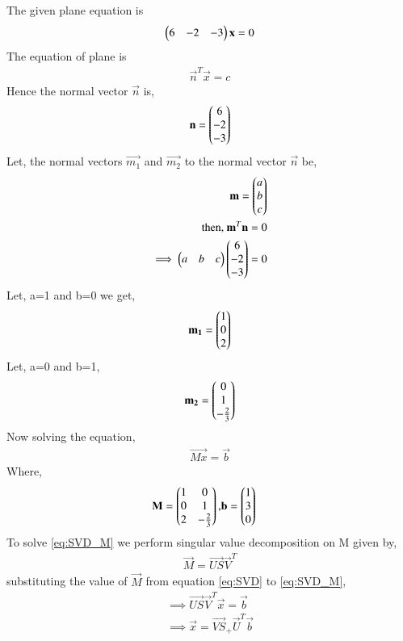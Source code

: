 \documentclass[journal,12pt,twocolumn]{IEEEtran}
\begin{document}
  The given plane equation is
\begin{align}
\begin{pmatrix}6&-2&-3\end{pmatrix}\mathbf{x} = 0\label{eq:genform}
\end{align}
The equation of plane is
\begin{align}
\vec{n}^T\vec{x} = c
\end{align}
Hence the normal vector $\vec{n}$ is,
\begin{align}
\mathbf{n} = \begin{pmatrix}6\\-2\\-3\end{pmatrix}
\end{align}
Let, the normal vectors $\vec{m_1}$ and $\vec{m_2}$ to the normal vector $\vec{n}$ be, 
\begin{align}
\mathbf{m} = \begin{pmatrix}a\\b\\c\end{pmatrix}\\
\mbox{then, } \mathbf{m}^T\mathbf{n} = 0\\
\implies \begin{pmatrix}a&b&c\end{pmatrix}\begin{pmatrix}6\\-2\\-3\end{pmatrix} = 0
\end{align}  
Let, a=1 and b=0 we get,
\begin{align}
\mathbf{m_1} = \begin{pmatrix}1\\0\\2\end{pmatrix}
\end{align}
Let, a=0 and b=1,
\begin{align}
\mathbf{m_2} = \begin{pmatrix}0\\1\\-\frac{2}{3}\end{pmatrix}
\end{align}
Now solving the equation,
\begin{align}
\vec{Mx} = \vec{b}
\label{eq:SVD_M}
\end{align}
Where,
\begin{align}
\mathbf{M} = \begin{pmatrix}1&0\\0&1\\2&-\frac{2}{3}\end{pmatrix} , & \mathbf{b} = \begin{pmatrix}1\\3\\0\end{pmatrix}\label{eq:b}
\end{align}
To solve \eqref{eq:SVD_M} we perform singular value decomposition on M given by, 
\begin{align}
\vec{M} = \vec{US}\vec{V}^T
\label{eq:SVD}
\end{align}
substituting the value of $\vec{M}$ from equation \eqref{eq:SVD} to \eqref{eq:SVD_M},
\begin{align}
\implies \vec{US}\vec{V}^T\vec{x} = \vec{b}\\
\implies \vec{x} = \vec{VS}_+\vec{U}^T\vec{b} \label{eq:x}
\end{align}
\end{document}
